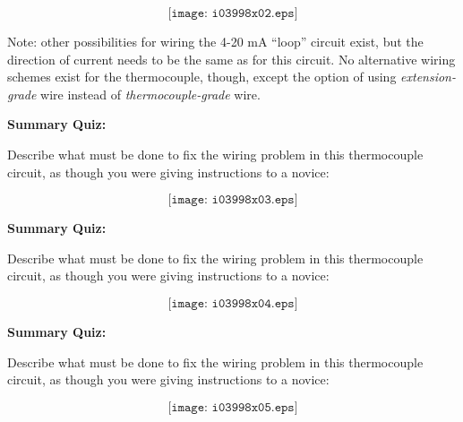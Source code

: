 
$$\texttt{[image: i03998x02.eps]}$$

Note: other possibilities for wiring the 4-20 mA ``loop'' circuit exist, but the direction of current needs to be the same as for this circuit.  No alternative wiring schemes exist for the thermocouple, though, except the option of using {\it extension-grade} wire instead of {\it thermocouple-grade} wire.

\vfil \eject

\noindent
{\bf Summary Quiz:}

Describe what must be done to fix the wiring problem in this thermocouple circuit, as though you were giving instructions to a novice:

$$\texttt{[image: i03998x03.eps]}$$

\vfil \eject

\noindent
{\bf Summary Quiz:}

Describe what must be done to fix the wiring problem in this thermocouple circuit, as though you were giving instructions to a novice:

$$\texttt{[image: i03998x04.eps]}$$

\vfil \eject

\noindent
{\bf Summary Quiz:}

Describe what must be done to fix the wiring problem in this thermocouple circuit, as though you were giving instructions to a novice:

$$\texttt{[image: i03998x05.eps]}$$






